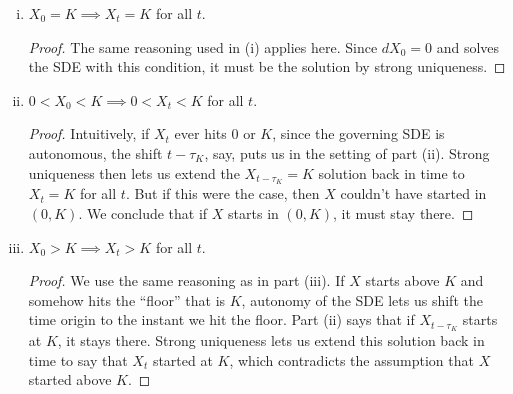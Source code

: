 \documentclass[11pt,letterpaper]{report}
\theoremstyle{definition}
\begin{document}
\begin{enumerate}[(a)]
\begin{enumerate}[(i)]
		\item $X_0 = K\implies X_t= K$ for all $t$.
		\begin{proof}
			The same reasoning used in (i) applies here. Since $dX_0 = 0$ and solves the SDE with this condition, it must be the solution by strong uniqueness.
		\end{proof}

		\item $0<X_0<K\implies 0<X_t<K$ for all $t$.
		\begin{proof}
			Intuitively, if $X_t$ ever hits 0 or $K$, since the governing SDE is autonomous, the shift $t-\tau_K$, say, puts us in the setting of part (ii). Strong uniqueness then lets us extend the $X_{t-\tau_K} = K$ solution back in time to $X_t = K$ for all $t$. But if this were the case, then $X$ couldn't have started in $(0, K)$. We conclude that if $X$ starts in $(0, K)$, it must stay there.
		\end{proof}

		\item $X_0>K\implies X_t>K$ for all $t$.
		\begin{proof}
			We use the same reasoning as in part (iii). If $X$ starts above $K$ and somehow hits the ``floor'' that is $K$, autonomy of the SDE lets us shift the time origin to the instant we hit the floor. Part (ii) says that if $X_{t-\tau_K}$ starts at $K$, it stays there. Strong uniqueness lets us extend this solution back in time to say that $X_t$ started at $K$, which contradicts the assumption that $X$ started above $K$.
		\end{proof}
	\end{enumerate}
\end{enumerate}
\end{document}
